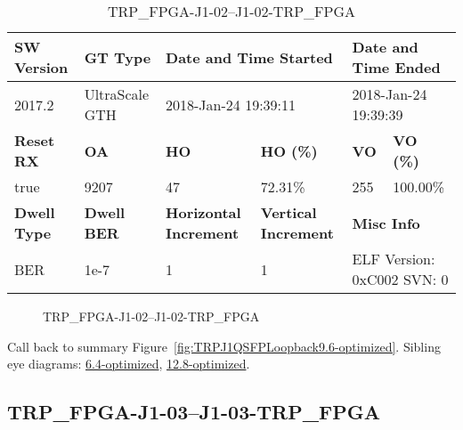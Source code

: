 \begin{table}[h]
\centering
\caption{TRP\_FPGA-J1-02--J1-02-TRP\_FPGA}
\label{tab:TRPFPGAJ102J102TRPFPGA9.6-optimized}
\begin{tabular}{@{}|l|l|l|l|l|l|@{}}
\toprule
\textbf{SW Version}                & \textbf{GT Type}   & \multicolumn{2}{l|}{\textbf{Date and Time Started}}            & \multicolumn{2}{l|}{\textbf{Date and Time Ended}}        \\ \midrule
2017.2                       & UltraScale GTH          & \multicolumn{2}{l|}{2018-Jan-24 19:39:11}                   & \multicolumn{2}{l|}{2018-Jan-24 19:39:39}               \\ \midrule
\textbf{Reset RX}                  & \textbf{OA} & \textbf{HO}   & \textbf{HO (\%)} & \textbf{VO} & \textbf{VO (\%)} \\ \midrule
true & 9207        & 47          & 72.31\%        & 255        & 100.00\%       \\ \midrule
\textbf{Dwell Type}                & \textbf{Dwell BER} & \textbf{Horizontal Increment} & \textbf{Vertical Increment}    & \multicolumn{2}{l|}{\textbf{Misc Info}}                  \\ \midrule
BER                            & 1e-7        & 1        & 1           & \multicolumn{2}{l|}{ELF Version: 0xC002 SVN: 0}                         \\ \bottomrule
\end{tabular}
\end{table}

\begin{figure}[h]
\caption{TRP\_FPGA-J1-02--J1-02-TRP\_FPGA} \label{fig:TRPFPGAJ102J102TRPFPGA9.6-optimized}
\end{figure}

Call back to summary Figure~\ref{fig:TRPJ1QSFPLoopback9.6-optimized}.
Sibling eye diagrams: \hyperref[sec:TRPFPGAJ102J102TRPFPGA6.4-optimized]{6.4-optimized}, \hyperref[sec:TRPFPGAJ102J102TRPFPGA12.8-optimized]{12.8-optimized}.

\clearpage
\newpage


\subsection{TRP\_FPGA-J1-03--J1-03-TRP\_FPGA}\label{sec:TRPFPGAJ103J103TRPFPGA9.6-optimized}

